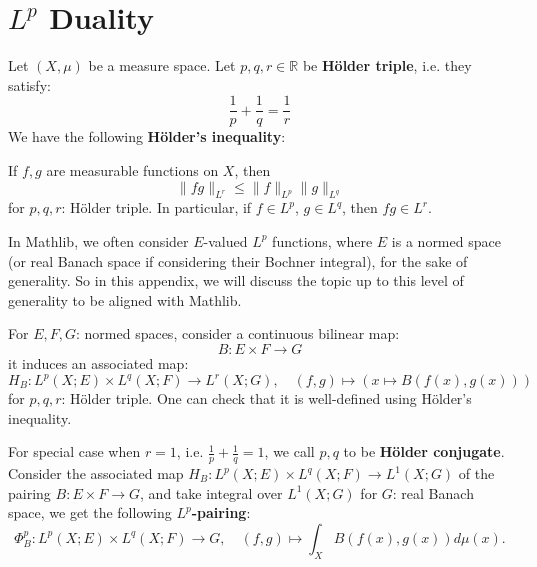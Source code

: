 
\chapter{\texorpdfstring{$L^p$ Duality}{L^p Duality}}
Let $(X,\mu)$ be a measure space.
Let $p,q,r\in\mathbb{R}$ be \textbf{H\"{o}lder triple}, i.e. they satisfy:
\begin{equation*}
    \frac{1}{p}+\frac{1}{q}=\frac{1}{r}
\end{equation*}
We have the following \textbf{H\"{o}lder's inequality}:
\begin{theorem}\label{Holder inequality}
If $f,g$ are measurable functions on $X$, then 
\begin{equation*}
    \|fg\|_{L^r}\leq \|f\|_{L^p}\|g\|_{L^q}
\end{equation*}
for $p,q,r$: H\"{o}lder triple. In particular, if $f\in L^p$, $g\in L^q$, 
then $fg\in L^r$.
\end{theorem}

In Mathlib, we often consider $E$-valued $L^p$ functions, where $E$ is a normed space (or 
real Banach space if considering their Bochner integral), for the sake of generality. So in this appendix,
we will discuss the topic up to this level of generality to be aligned with Mathlib.

For $E,F,G$: normed spaces, consider a continuous bilinear map:
\begin{equation*}
    B: E\times F\rightarrow G
\end{equation*}
it induces an associated map:
\begin{equation*}
    H_B : L^p(X;E)\times L^q(X;F)\rightarrow L^r(X;G),\quad (f,g)\mapsto (x\mapsto B(f(x),g(x)))
\end{equation*}
for $p,q,r$: H\"{o}lder triple. One can check that it is well-defined using H\"{o}lder's inequality.

For special case when $r=1$, i.e. $\frac{1}{p}+\frac{1}{q}=1$, we call $p,q$ to be \textbf{H\"{o}lder conjugate}. 
Consider the associated map $H_B: L^p(X;E)\times L^q(X;F)\rightarrow L^1(X;G)$ of the pairing $B: E\times F\rightarrow G$,
and take integral over $L^1(X;G)$ for $G$: real Banach space, we get the following \textbf{$L^p$-pairing}:
\begin{equation*}
    \Phi_B^p : L^p(X;E)\times L^q(X;F)\rightarrow G,\quad (f,g)\mapsto \int_X B(f(x),g(x)) d\mu (x).
\end{equation*}

